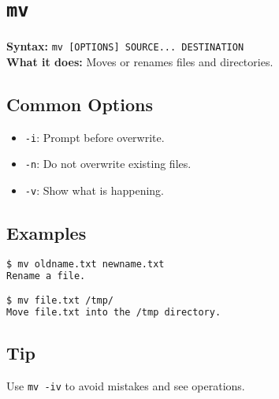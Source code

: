 \documentclass[10pt,oneside]{scrbook}
\begin{document}
\section{\texttt{mv}}
\begin{cmdbox}
  \textbf{Syntax:} \lstinline!mv [OPTIONS] SOURCE... DESTINATION! \\
  \textbf{What it does:} Moves or renames files and directories.
\end{cmdbox}
\begin{commanddetails}
  \subsection*{Common Options}
  \begin{itemize}
    \item \lstinline!-i!: Prompt before overwrite.
    \item \lstinline!-n!: Do not overwrite existing files.
    \item \lstinline!-v!: Show what is happening.
  \end{itemize}

  \subsection*{Examples}
  \begin{lstlisting}[language=bash]
$ mv oldname.txt newname.txt
Rename a file.

$ mv file.txt /tmp/
Move file.txt into the /tmp directory.
  \end{lstlisting}

  \subsection*{Tip}
  Use \lstinline!mv -iv! to avoid mistakes and see operations.
\end{commanddetails}

\end{document}
